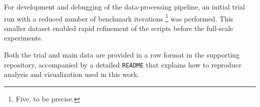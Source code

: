 For development and debugging of the data-processing pipeline, an initial
trial run with a reduced number of benchmark iterations \footnote{Five, to be
precise.} was performed. This smaller dataset enabled rapid refinement of
the scripts before the full-scale experiments.

Both the trial and main data are provided in a raw format in the supporting
repository, accompanied by a detailed \texttt{README} that explains how to
reproduce analysis and visualization used in this work.
